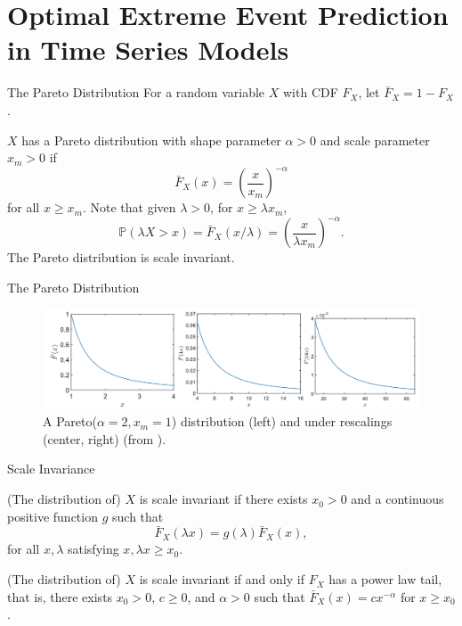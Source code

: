 \documentclass{beamer}
\def\P{\mathbb P}
\begin{document}
\section{Optimal Extreme Event Prediction in Time Series Models}

\begin{frame}{The Pareto Distribution}
    For a random variable $X$ with CDF $F_X$, let $\bar{F}_X = 1 - F_X$.

    \smallskip
    
    $X$ has a Pareto distribution with shape parameter $\alpha > 0$ and scale parameter $x_m > 0$ if
    \[
    \bar{F}_X(x) = \left(\frac{x}{x_m}\right)^{-\alpha}
    \]
    for all $x \ge x_m$. Note that given $\lambda > 0$, for $x \ge \lambda x_m$,
    \[
    \P(\lambda X > x) = \bar{F}_X(x / \lambda) = \left(\frac{x}{\lambda x_m}\right)^{-\alpha}.
    \]
    The Pareto distribution is scale invariant.
\end{frame}

\begin{frame}{The Pareto Distribution}
    \begin{figure}[h!]
        \centering
        \includegraphics[scale=0.3]{scaled_paretos.png}
        \caption{A Pareto($\alpha = 2, x_m = 1$) distribution (left) and under rescalings (center, right) (from \cite{nair2022thef}).}
        \label{fig:scaled_paretos}
    \end{figure}
\end{frame}

\begin{frame}{Scale Invariance}
    \begin{definition}
        (The distribution of) $X$ is scale invariant if there exists $x_0 > 0$ and a continuous positive function $g$ such that
        \[
        \bar{F}_X(\lambda x) = g(\lambda)\bar{F}_X(x),
        \]
        for all $x, \lambda$ satisfying $x, \lambda x \ge x_0$.
    \end{definition}
    \begin{theorem}
        (The distribution of) $X$ is scale invariant if and only if $F_X$ has a power law tail, that is, there exists $x_0 > 0$, $c \ge 0$, and $\alpha > 0$ such that $\bar{F}_X(x) = c x^{-\alpha}$ for $x \ge x_0$.
    \end{theorem}
\end{frame}
\end{document}
